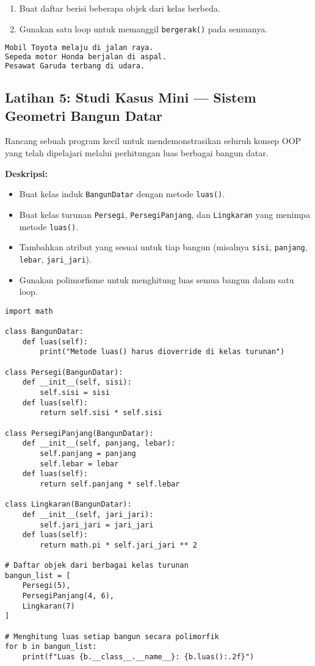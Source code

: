 \begin{enumerate}
    \item Buat daftar berisi beberapa objek dari kelas berbeda.
    \item Gunakan satu loop untuk memanggil \texttt{bergerak()} pada semuanya.
\end{enumerate}

\begin{lstlisting}[language=bash, caption={Output yang Diharapkan}]
Mobil Toyota melaju di jalan raya.
Sepeda motor Honda berjalan di aspal.
Pesawat Garuda terbang di udara.
\end{lstlisting}

\subsection*{Latihan 5: Studi Kasus Mini — Sistem Geometri Bangun Datar}

Rancang sebuah program kecil untuk mendemonstrasikan seluruh konsep OOP yang telah dipelajari melalui perhitungan luas berbagai bangun datar.

\textbf{Deskripsi:}
\begin{itemize}
    \item Buat kelas induk \texttt{BangunDatar} dengan metode \texttt{luas()}.
    \item Buat kelas turunan \texttt{Persegi}, \texttt{PersegiPanjang}, dan \texttt{Lingkaran} yang menimpa metode \texttt{luas()}.
    \item Tambahkan atribut yang sesuai untuk tiap bangun (misalnya \texttt{sisi}, \texttt{panjang}, \texttt{lebar}, \texttt{jari\_jari}).
    \item Gunakan polimorfisme untuk menghitung luas semua bangun dalam satu loop.
\end{itemize}

\begin{lstlisting}[style=PythonStyle, caption={Contoh Implementasi}]
import math

class BangunDatar:
    def luas(self):
        print("Metode luas() harus dioverride di kelas turunan")

class Persegi(BangunDatar):
    def __init__(self, sisi):
        self.sisi = sisi
    def luas(self):
        return self.sisi * self.sisi

class PersegiPanjang(BangunDatar):
    def __init__(self, panjang, lebar):
        self.panjang = panjang
        self.lebar = lebar
    def luas(self):
        return self.panjang * self.lebar

class Lingkaran(BangunDatar):
    def __init__(self, jari_jari):
        self.jari_jari = jari_jari
    def luas(self):
        return math.pi * self.jari_jari ** 2

# Daftar objek dari berbagai kelas turunan
bangun_list = [
    Persegi(5),
    PersegiPanjang(4, 6),
    Lingkaran(7)
]

# Menghitung luas setiap bangun secara polimorfik
for b in bangun_list:
    print(f"Luas {b.__class__.__name__}: {b.luas():.2f}")
\end{lstlisting}

